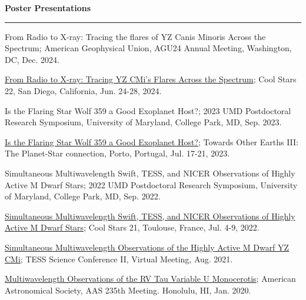 \documentclass[12pt]{article}
\begin{document}


\noindent
{\bf Poster Presentations} \\
\vspace{-10mm}
\begin{center}
\rule{\textwidth}{0.2mm}
\end{center}
\vspace{-3mm}
\noindent
\begin{etaremune}
\renewcommand\labelenumi{\bfseries\theenumi .}

\item From Radio to X-ray: Tracing the flares of YZ Canis Minoris Across the Spectrum; American Geophysical Union, AGU24 Annual Meeting, Washington, DC, Dec. 2024.

\item \href{https://coolstars22.github.io/docs/CS22_Abstract_booklet.pdf}{From Radio to X-ray: Tracing YZ CMi's Flares Across the
Spectrum}; Cool Stars 22, San Diego, California, Jun. 24-28, 2024.

\item Is the Flaring Star Wolf 359 a Good Exoplanet Host?; 2023 UMD Postdoctoral Research Symposium, University of Maryland, College Park, MD, Sep. 2023.

\item \href{http://www.astro.up.pt/~sousasag/toe2023/Abstract_book_Posters.pdf}{Is the Flaring Star Wolf 359 a Good Exoplanet Host?}; Towards Other Earths III: The Planet-Star connection, Porto, Portugal, Jul. 17-21, 2023.

\item Simultaneous Multiwavelength Swift, TESS, and NICER Observations of Highly Active M Dwarf Stars; 2022 UMD Postdoctoral Research Symposium, University of Maryland, College Park, MD, Sep. 2022.

\item \href{https://coolstars21.github.io/docs/CS21booklet.pdf}{Simultaneous Multiwavelength Swift, TESS, and NICER Observations of Highly Active M Dwarf Stars}; Cool Stars 21, Toulouse, France, Jul. 4-9, 2022.

\item \href{https://zenodo.org/record/5142127#.YmbZsJPMJCV}{Simultaneous Multiwavelength Observations of the Highly Active M Dwarf YZ CMi}; TESS Science Conference II, Virtual Meeting, Aug. 2021.

\item \href{https://ui.adsabs.harvard.edu/abs/2020AAS...23510607V/abstract}{Multiwavelength Observations of the RV Tau Variable U Monocerotis}; American Astronomical Society, AAS 235th Meeting.  Honolulu, HI, Jan.  2020.


\end{etaremune}
\end{document}
